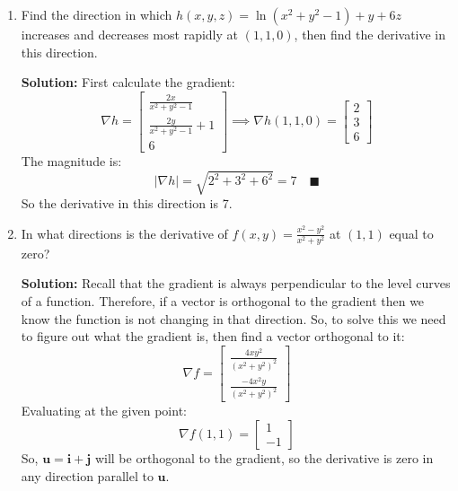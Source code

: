 \documentclass[letterpaper, 11pt]{article}
\begin{document}
\begin{enumerate}
\item Find the direction in which $h(x,y,z) = \ln(x^2 + y^2 -1) + y + 6z$ increases and decreases most rapidly at $(1,1,0)$, then find the derivative in this direction. 
\par \textbf{Solution:} First calculate the gradient:
\[ \nabla h = \left[ \begin{array}{c} \frac{2x}{x^2 + y^2 - 1} \\ \frac{2y}{x^2 + y^2 -1} + 1 \\ 6 \end{array} \right] \implies 
\nabla h(1,1,0) =  \left[ \begin{array}{c} 2 \\ 3 \\ 6 \end{array} \right] \]
The magnitude is:
\[ |\nabla h| = \sqrt{ 2^2 + 3^2 + 6^2 } = 7 \quad\blacksquare \]
So the derivative in this direction is 7. 



\item In what directions is the derivative of $f(x,y) = \frac{ x^2 - y^2}{x^2 + y^2}$ at $(1,1)$ equal to zero? 
\par \textbf{Solution:} Recall that the gradient is always perpendicular to the level curves of a function. Therefore, if a vector is orthogonal to the gradient then we know the function is not changing in that direction. So, to solve this we need to figure out what the gradient is, then find a vector orthogonal to it:
\[ \nabla f = \left[ \begin{array}{c} \frac{ 4xy^2}{(x^2 + y^2)^2} \\ \frac{ -4x^2y}{(x^2 + y^2)^2} \end{array} \right] \]
Evaluating at the given point:
\[ \nabla f(1,1) = \left[ \begin{array}{c} 1 \\ -1 \end{array} \right] \]
So, $\bm{u} = \bm{i} + \bm{j}$ will be orthogonal to the gradient, so the derivative is zero in any direction parallel to $\bm{u}$. 

\end{enumerate}
\end{document}
